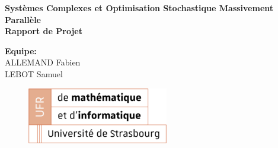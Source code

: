 \documentclass{article}
\begin{document}
\thispagestyle{empty}
\addtocounter{page}{-1}
\begin{center}
	\baselineskip=50pt
	\vspace*{1cm}
	\textbf{{\Huge Systèmes Complexes et Optimisation Stochastique Massivement Parallèle}}\\
	\vspace*{0.25cm}
	\textbf{{\Huge Rapport de Projet}}\\
	\vspace*{0.25cm}
	\begin{minipage}[c]{.46\linewidth}
        \centering
        \textbf{Equipe:}\\
		ALLEMAND Fabien\\
        LEBOT Samuel
    \end{minipage}
\end{center}
\vspace{0.1cm}

\begin{figure}[H]
\centering
\centerline{\includegraphics[scale=1.]{img/logo_UFR_2.png}}
\end{figure}

\newpage
\tableofcontents

\newpage
\listoffigures

\newpage


\newpage


\newpage


\newpage


\newpage

\end{document}
